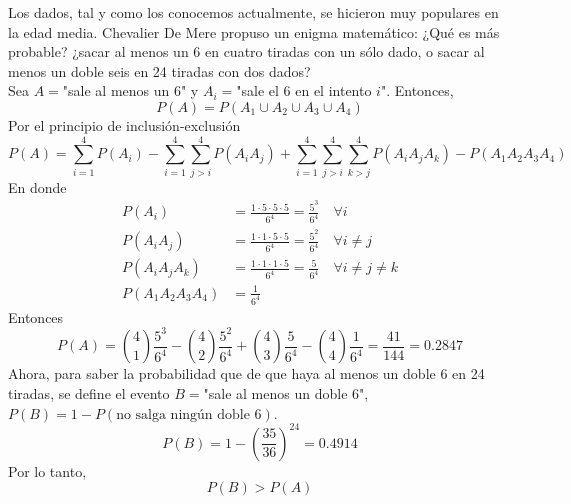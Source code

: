 \item Los dados, tal y como los conocemos actualmente, se hicieron muy populares en la edad media. Chevalier De Mere propuso un enigma matemático: ¿Qué es más probable? ¿sacar al menos un 6 en cuatro tiradas con un sólo dado, o sacar al menos un doble seis en 24 tiradas con dos dados?\e\\
    Sea $A=$"sale al menos un 6" y $A_i=$"sale el 6 en el intento $i$". Entonces, \[P(A)=P(A_1\cup A_2\cup A_3\cup A_4)\]
    Por el principio de inclusión-exclusión\[P(A)=\sum\limits_{i=1}^4P(A_i)-\sum\limits_{i=1}^4\sum\limits_{j>i}^4P(A_iA_j)+\sum\limits_{i=1}^4\sum\limits_{j>i}^4\sum\limits_{k>j}^4P(A_iA_jA_k)-P(A_1A_2A_3A_4)\]
    En donde 
    \begin{align*}
        P(A_i)&=\frac{1\cdot5\cdot5\cdot5}{6^4}=\frac{5^3}{6^4}\quad\forall i\\
        P(A_iA_j)&=\frac{1\cdot1\cdot5\cdot5}{6^4}=\frac{5^2}{6^4}\quad\forall i\neq j\\
        P(A_iA_jA_k)&=\frac{1\cdot1\cdot1\cdot5}{6^4}=\frac{5}{6^4}\quad\forall i\neq j\neq k\\
        P(A_1A_2A_3A_4)&=\frac{1}{6^4}
    \end{align*}
    Entonces
    \[P(A)=\binom{4}{1}\frac{5^3}{6^4}-\binom{4}{2}\frac{5^2}{6^4}+\binom{4}{3}\frac{5}{6^4}-\binom{4}{4}\frac{1}{6^4}=\frac{41}{144}=0.2847\]
    Ahora, para saber la probabilidad que de que haya al menos un doble 6 en 24 tiradas, se define el evento $B=$"sale al menos un doble 6", $P(B)=1-P(\text{no salga ningún doble 6})$.\[P(B)=1-\left(\frac{35}{36}\right)^{24}=0.4914\]
    Por lo tanto,\[P(B)>P(A)\]